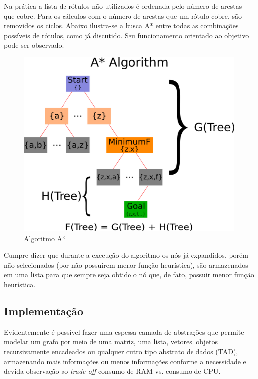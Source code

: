 \documentclass[12pt]{article}
\begin{document}
		Na prática a lista de rótulos não utilizados é ordenada pelo número de arestas que cobre. Para os cálculos com o número de arestas que um rótulo cobre, são removidos os ciclos. Abaixo ilustra-se a busca A* entre todas as combinações possíveis de rótulos, como já discutido. Seu funcionamento orientado ao objetivo pode ser observado.

		\begin{center}
		\begin{figure}[H]
		\includegraphics[width=1\textwidth]{aestrela.png}
		\caption{Algoritmo A*}
		\label{fig:aestrela}
		\end{figure}
		\end{center}

		Cumpre dizer que durante a execução do algoritmo os nós já expandidos, porém não selecionados (por não possuírem menor função heurística), são armazenados em uma lista para que sempre seja obtido o nó que, de fato, possuir menor função heurística.

	\subsection{Implementação}\label{sec:implementacao}

		Evidentemente é possível fazer uma espessa camada de abstrações que permite modelar um grafo por meio de uma matriz, uma lista, vetores, objetos recursivamente encadeados ou qualquer outro tipo abstrato de dados (TAD), armazenando mais informações ou menos informações conforme a necessidade e devida observação ao \textit{trade-off} consumo de RAM vs. consumo de CPU.
\end{document}
